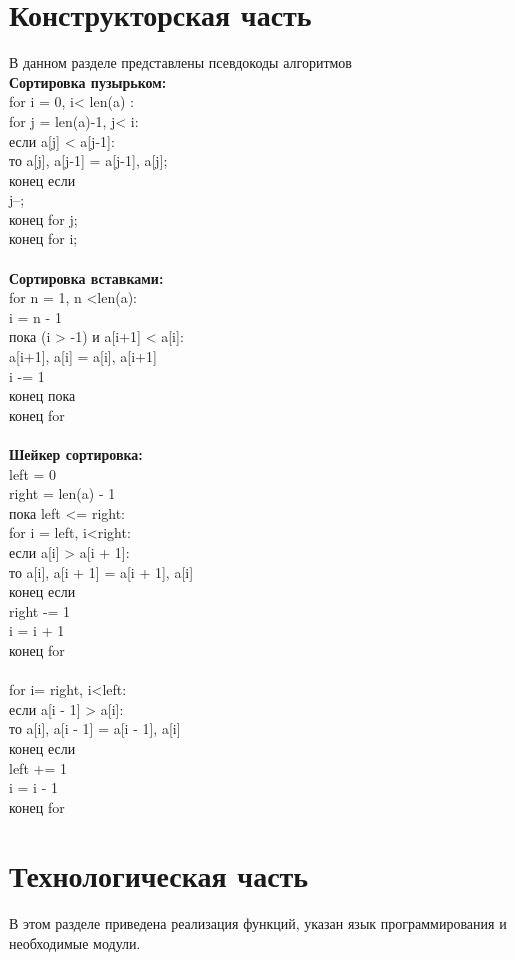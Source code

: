 \documentclass[12pt]{article}
\begin{document}
\section{Конструкторская часть}
В данном разделе представлены псевдокоды алгоритмов 
\\\textbf{Сортировка пузырьком:}
\\for i = 0, i< len(a) :\\
for j = len(a)-1, j< i:\\
	если a[j] < a[j-1]:\\
		то a[j], a[j-1] = a[j-1], a[j];\\
	конец если\\
	j--;\\
	конец for j;\\
конец for i;\\
\\\textbf{Сортировка вставками:}
\\for  n = 1, n <len(a):\\
i = n - 1\\
пока (i > -1) и a[i+1] < a[i]:\\
	a[i+1], a[i] = a[i], a[i+1]\\
	i -= 1\\
конец пока\\
конец for\\
\newpage
\\\textbf{Шейкер сортировка:}\\
left = 0\\
right = len(a) - 1\\
пока left <= right:\\
for i = left, i<right:\\
если a[i] > a[i + 1]:\\
то a[i], a[i + 1] = a[i + 1], a[i]\\
конец если\\
right -= 1\\
i = i + 1\\
конец for\\
\\for i= right, i<left:\\
если a[i - 1] > a[i]:\\
то a[i], a[i - 1] = a[i - 1], a[i]\\
конец если\\
left += 1\\
i = i - 1\\
конец for\\
\newpage
\section{Технологическая часть}
В этом разделе приведена реализация функций, указан язык программирования и необходимые модули. 
\end{document}
